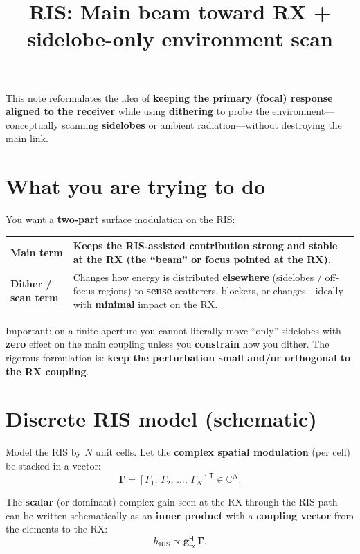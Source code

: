\documentclass[11pt,a4paper]{article}
\title{RIS: Main beam toward RX + sidelobe-only environment scan}
\author{}
\date{}
\newcommand{\C}{\mathbb{C}}
\newcommand{\rx}{\mathrm{rx}}
\begin{document}
\maketitle

This note reformulates the idea of \textbf{keeping the primary (focal) response aligned to the receiver} while using \textbf{dithering} to probe the environment---conceptually scanning \textbf{sidelobes} or ambient radiation---without destroying the main link.

\section{What you are trying to do}

You want a \textbf{two-part} surface modulation on the RIS:

\begin{center}
\begin{tabular}{|l|p{11cm}|}
\hline
\textbf{Main term} & Keeps the RIS-assisted contribution \textbf{strong and stable} at the RX (the ``beam'' or \textbf{focus} pointed at the RX). \\
\hline
\textbf{Dither / scan term} & Changes how energy is distributed \textbf{elsewhere} (sidelobes / off-focus regions) to \textbf{sense} scatterers, blockers, or changes---ideally with \textbf{minimal} impact on the RX. \\
\hline
\end{tabular}
\end{center}

Important: on a finite aperture you cannot literally move ``only'' sidelobes with \textbf{zero} effect on the main coupling unless you \textbf{constrain} how you dither. The rigorous formulation is: \textbf{keep the perturbation small and/or orthogonal to the RX coupling}.

\section{Discrete RIS model (schematic)}

Model the RIS by $N$ unit cells. Let the \textbf{complex spatial modulation} (per cell) be stacked in a vector:
\begin{equation}
\bm{\Gamma} = [\Gamma_1,\, \Gamma_2,\, \ldots,\, \Gamma_N]^{\mathsf{T}} \in \C^N.
\end{equation}

The \textbf{scalar} (or dominant) complex gain seen at the RX through the RIS path can be written schematically as an \textbf{inner product} with a \textbf{coupling vector} from the elements to the RX:
\begin{equation}
h_{\mathrm{RIS}} \propto \mathbf{g}_{\rx}^{\mathsf{H}}\, \bm{\Gamma}.
\end{equation}
\end{document}
